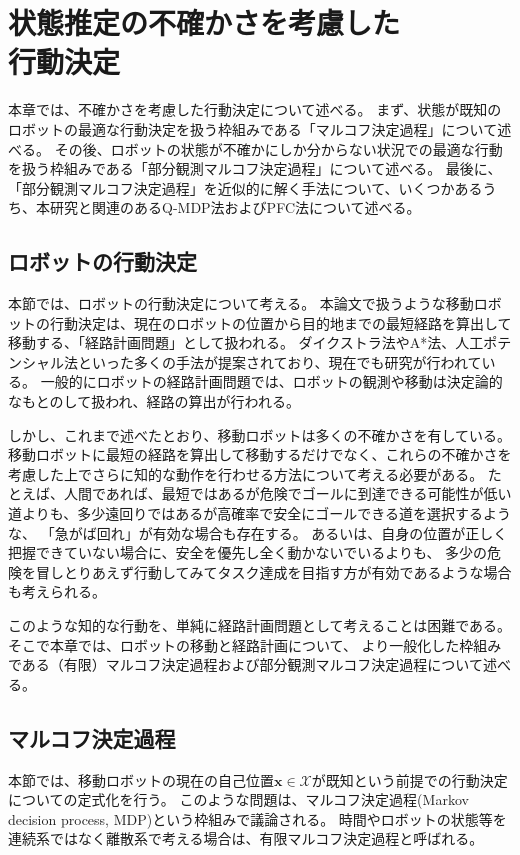 \chapter{状態推定の不確かさを考慮した\\行動決定}

本章では、不確かさを考慮した行動決定について述べる。
まず、状態が既知のロボットの最適な行動決定を扱う枠組みである「マルコフ決定過程」について述べる。
その後、ロボットの状態が不確かにしか分からない状況での最適な行動を扱う枠組みである「部分観測マルコフ決定過程」について述べる。
最後に、「部分観測マルコフ決定過程」を近似的に解く手法について、いくつかあるうち、本研究と関連のあるQ-MDP法およびPFC法について述べる。


\section{ロボットの行動決定}
本節では、ロボットの行動決定について考える。
本論文で扱うような移動ロボットの行動決定は、現在のロボットの位置から目的地までの最短経路を算出して移動する、「経路計画問題」として扱われる。
ダイクストラ法やA*法、人工ポテンシャル法といった多くの手法が提案されており、現在でも研究が行われている。
一般的にロボットの経路計画問題では、ロボットの観測や移動は決定論的なもとのして扱われ、経路の算出が行われる。

しかし、これまで述べたとおり、移動ロボットは多くの不確かさを有している。
移動ロボットに最短の経路を算出して移動するだけでなく、これらの不確かさを考慮した上でさらに知的な動作を行わせる方法について考える必要がある。
たとえば、人間であれば、最短ではあるが危険でゴールに到達できる可能性が低い道よりも、多少遠回りではあるが高確率で安全にゴールできる道を選択するような、
「急がば回れ」が有効な場合も存在する。
あるいは、自身の位置が正しく把握できていない場合に、安全を優先し全く動かないでいるよりも、
多少の危険を冒しとりあえず行動してみてタスク達成を目指す方が有効であるような場合も考えられる。

このような知的な行動を、単純に経路計画問題として考えることは困難である。
そこで本章では、ロボットの移動と経路計画について、
より一般化した枠組みである（有限）マルコフ決定過程および部分観測マルコフ決定過程について述べる。



\section{マルコフ決定過程} \label{section:mdp}
本節では、移動ロボットの現在の自己位置$\bm{x} \in \mathcal{X}$が既知という前提での行動決定についての定式化を行う。
このような問題は、マルコフ決定過程(Markov decision process, MDP)という枠組みで議論される。
時間やロボットの状態等を連続系ではなく離散系で考える場合は、有限マルコフ決定過程と呼ばれる。

